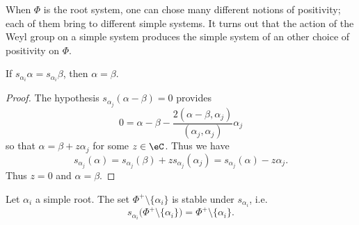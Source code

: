 When \( \Phi\) is the root system, one can chose many different notions of positivity; each of them bring to different simple systems. It turns out that the action of the Weyl group on a simple system produces the simple system of an other choice of positivity on \( \Phi\).

\begin{lemma}       \label{LemalphajsPhipinjsasbab}
    If \( s_{\alpha_i}\alpha=s_{\alpha_i}\beta\), then \( \alpha=\beta\).
\end{lemma}

\begin{proof}
    The hypothesis \( s_{\alpha_j}(\alpha-\beta)=0\) provides
    \begin{equation}
        0=\alpha-\beta-\frac{ 2(\alpha-\beta,\alpha_j) }{ (\alpha_j,\alpha_j) }\alpha_j
    \end{equation}
    so that \( \alpha=\beta+z\alpha_j\) for some \( z\in\eC\). Thus we have
    \begin{equation}
        s_{\alpha_j}(\alpha)=s_{\alpha_j}(\beta)+zs_{\alpha_j}(\alpha_j)=s_{\alpha_j}(\alpha)-z\alpha_j.
    \end{equation}
    Thus \( z=0\) and \( \alpha=\beta\).
\end{proof}

\begin{proposition}     \label{PropsalphaisurjPhipmaj}
    Let \( \alpha_i\) a simple root. The set \( \Phi^+\setminus\{ \alpha_i \}\) is stable under \( s_{\alpha_i}\), i.e.
    \begin{equation}
        s_{\alpha_i}\big( \Phi^+\setminus\{ \alpha_i \} \big)=\Phi^+\setminus\{ \alpha_i \}.
    \end{equation}
\end{proposition}

